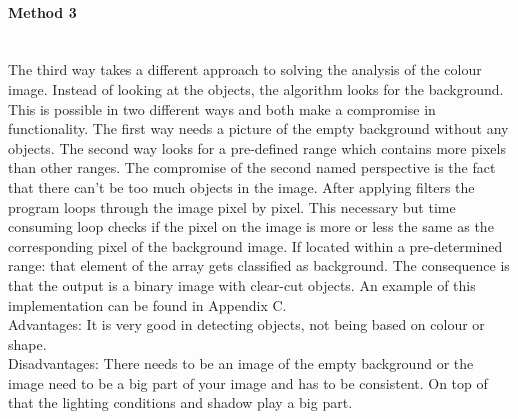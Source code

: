\documentclass{article}
\begin{document}
\paragraph{Method 3}\mbox{}\\
The third way takes a different approach to solving the analysis of the colour image. Instead of looking at the objects, the algorithm looks for the background. This is possible in two different ways and both make a compromise in functionality. The first way needs a picture of the empty background without any objects. The second way looks for a pre-defined range which contains more pixels than other ranges. The compromise of the second named perspective is the fact that there can't be too much objects in the image. After applying filters the program loops through the image pixel by pixel. This necessary but time consuming loop checks if the pixel on the image is more or less the same as the corresponding pixel of the background image. If located within a pre-determined range: that element of the array gets classified as background. The consequence is that the output is a binary image with clear-cut objects. An example of this implementation can be found in Appendix C. 
\\Advantages: It is very good in detecting objects, not being based on colour or shape.
\\Disadvantages: There needs to be an image of the empty background or the image need to be a big part of your image and has to be consistent. On top of that the lighting conditions and shadow play a big part. 
\end{document}
